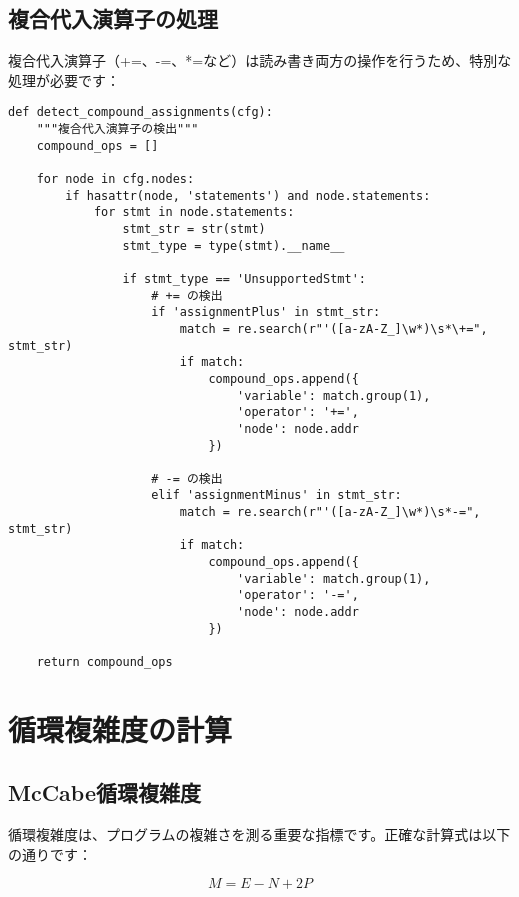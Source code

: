 \documentclass[12pt,a4paper]{article}
\begin{document}
\subsection{複合代入演算子の処理}

複合代入演算子（+=、-=、*=など）は読み書き両方の操作を行うため、特別な処理が必要です：

\begin{lstlisting}[caption=複合代入演算子の詳細検出]
def detect_compound_assignments(cfg):
    """複合代入演算子の検出"""
    compound_ops = []

    for node in cfg.nodes:
        if hasattr(node, 'statements') and node.statements:
            for stmt in node.statements:
                stmt_str = str(stmt)
                stmt_type = type(stmt).__name__

                if stmt_type == 'UnsupportedStmt':
                    # += の検出
                    if 'assignmentPlus' in stmt_str:
                        match = re.search(r"'([a-zA-Z_]\w*)\s*\+=", stmt_str)
                        if match:
                            compound_ops.append({
                                'variable': match.group(1),
                                'operator': '+=',
                                'node': node.addr
                            })

                    # -= の検出
                    elif 'assignmentMinus' in stmt_str:
                        match = re.search(r"'([a-zA-Z_]\w*)\s*-=", stmt_str)
                        if match:
                            compound_ops.append({
                                'variable': match.group(1),
                                'operator': '-=',
                                'node': node.addr
                            })

    return compound_ops
\end{lstlisting}

\section{循環複雑度の計算}

\subsection{McCabe循環複雑度}

循環複雑度は、プログラムの複雑さを測る重要な指標です。正確な計算式は以下の通りです：

\begin{equation}
M = E - N + 2P
\end{equation}
\end{document}
